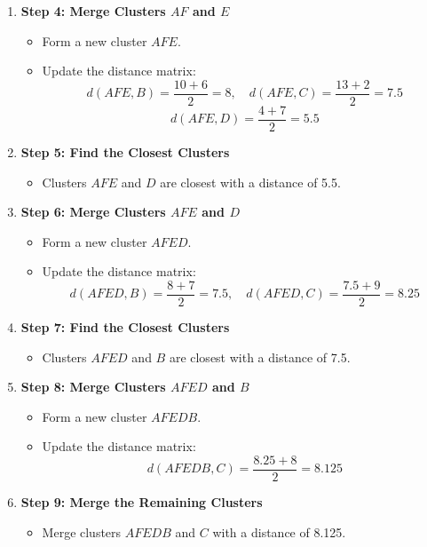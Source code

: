 \documentclass[oneside,solution]{seu-ml-assign}
\begin{document}
\begin{enumerate}
  \item \textbf{Step 4: Merge Clusters \(AF\) and \(E\)}
  \begin{itemize}
      \item Form a new cluster \(AFE\).
      \item Update the distance matrix:
      \[
      d(AFE, B) = \frac{10 + 6}{2} = 8, \quad d(AFE, C) = \frac{13 + 2}{2} = 7.5
      \]
      \[
      d(AFE, D) = \frac{4 + 7}{2} = 5.5
      \]
  \end{itemize}

  \item \textbf{Step 5: Find the Closest Clusters}
  \begin{itemize}
      \item Clusters \(AFE\) and \(D\) are closest with a distance of 5.5.
  \end{itemize}

  \item \textbf{Step 6: Merge Clusters \(AFE\) and \(D\)}
  \begin{itemize}
      \item Form a new cluster \(AFED\).
      \item Update the distance matrix:
      \[
      d(AFED, B) = \frac{8 + 7}{2} = 7.5, \quad d(AFED, C) = \frac{7.5 + 9}{2} = 8.25
      \]
  \end{itemize}

  \item \textbf{Step 7: Find the Closest Clusters}
  \begin{itemize}
      \item Clusters \(AFED\) and \(B\) are closest with a distance of 7.5.
  \end{itemize}

  \item \textbf{Step 8: Merge Clusters \(AFED\) and \(B\)}
  \begin{itemize}
      \item Form a new cluster \(AFEDB\).
      \item Update the distance matrix:
      \[
      d(AFEDB, C) = \frac{8.25 + 8}{2} = 8.125
      \]
  \end{itemize}

  \item \textbf{Step 9: Merge the Remaining Clusters}
  \begin{itemize}
      \item Merge clusters \(AFEDB\) and \(C\) with a distance of 8.125.
  \end{itemize}
  
\end{enumerate}
\end{document}
